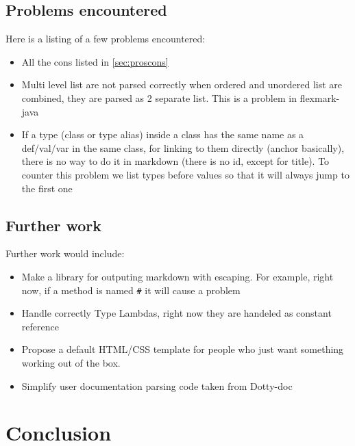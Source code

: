 \documentclass{report}
\begin{document}
\section{Problems encountered}
Here is a listing of a few problems encountered:
\begin{itemize}
    \item All the cons listed in \autoref{sec:proscons}
    \item Multi level list are not parsed correctly when ordered and unordered list are combined, they are parsed as 2 separate list. This is a problem in flexmark-java
    \item If a type (class or type alias) inside a class has the same name as a def/val/var in the same class, for linking to them directly (anchor basically), there is no way to do it in markdown (there is no id, except for title). To counter this problem we list types before values so that it will always jump to the first one
\end{itemize}

\section{Further work}
Further work would include:
\begin{itemize}
    \item Make a library for outputing markdown with escaping. For example, right now, if a method is named \texttt{\#} it will cause a problem
    \item Handle correctly Type Lambdas, right now they are handeled as constant reference
    \item Propose a default HTML/CSS template for people who just want something working out of the box.
    \item Simplify user documentation parsing code taken from Dotty-doc
\end{itemize}

\chapter{Conclusion}
\end{document}
